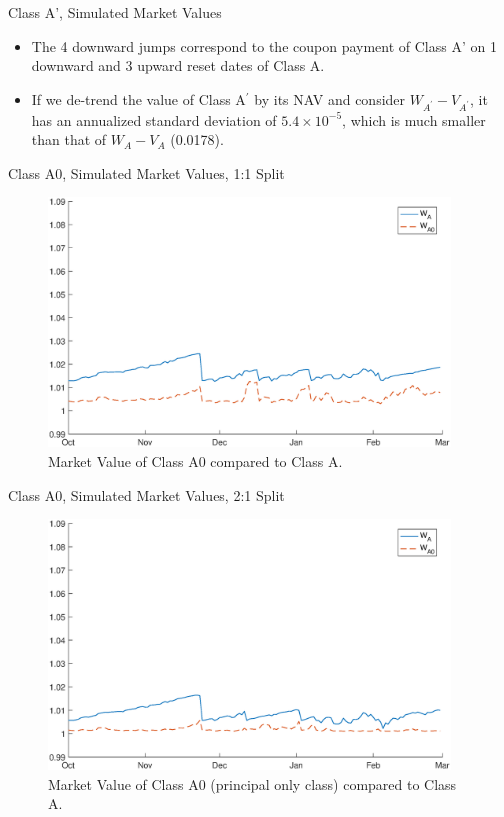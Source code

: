 \documentclass[notes=show, beamer, handout]{beamer}
\begin{document}
\begin{frame}{Class A', Simulated Market Values}

\begin{itemize}
\item The 4 downward jumps correspond to the coupon payment of Class A' on 1 downward and 3 upward reset dates of Class A.
\item If we de-trend the value of Class A$^\prime$ by its NAV and consider $W_{A^\prime}-V_{A^\prime}$, it has an annualized standard deviation of $5.4\times 10^{-5}$, which is much smaller than that of $W_{A}-V_{A}$ (0.0178).
\end{itemize}

\end{frame}

\begin{frame}{Class A0, Simulated Market Values, 1:1 Split}




\begin{figure}[htb]
\centering
\includegraphics[width=0.95\textwidth]{WA0_alpha1.eps}
\caption{Market Value of Class A0 compared to Class A. }
\label{fig:valA0a1}
\end{figure}
\end{frame}

\begin{frame}{Class A0, Simulated Market Values, 2:1 Split}

\begin{figure}[htb]
\centering
\includegraphics[width=0.95\textwidth]{WA0_alpha2.eps}
\caption{Market Value of Class A0 (principal only class) compared to Class A.}
\label{fig:valA0a2}
\end{figure}
\end{frame}
\end{document}
